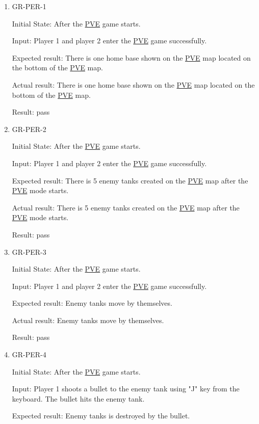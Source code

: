 \documentclass[12pt, titlepage]{article}
\begin{document}
\begin{enumerate}

\item{GR-PER-1\\}
					
Initial State: After the \underline{PVE} game starts.
					
Input: Player 1 and player 2 enter the \underline{PVE} game successfully.
					
Expected result: There is one home base shown on the \underline{PVE} map located on the bottom of the \underline{PVE} map.
					
Actual result: There is one home base shown on the \underline{PVE} map located on the bottom of the \underline{PVE} map.

Result: pass

\item{GR-PER-2\\}
					
Initial State: After the \underline{PVE} game starts.
					
Input: Player 1 and player 2 enter the \underline{PVE} game successfully.
					
Expected result: There is 5 enemy tanks created on the \underline{PVE} map after the \underline{PVE} mode starts.
					
Actual result: There is 5 enemy tanks created on the \underline{PVE} map after the \underline{PVE} mode starts. 

Result: pass

\item{GR-PER-3\\}
					
Initial State: After the \underline{PVE} game starts.
					
Input: Player 1 and player 2 enter the \underline{PVE} game successfully.
					
Expected result: Enemy tanks move by themselves. 
					
Actual result: Enemy tanks move by themselves. 

Result: pass

\item{GR-PER-4\\}
					
Initial State: After the \underline{PVE} game starts.
					
Input: Player 1 shoots a bullet to the enemy tank using "J" key from the keyboard. The bullet hits the enemy tank.
					
Expected result: Enemy tanks is destroyed by the bullet.
					

\end{enumerate}
\end{document}
